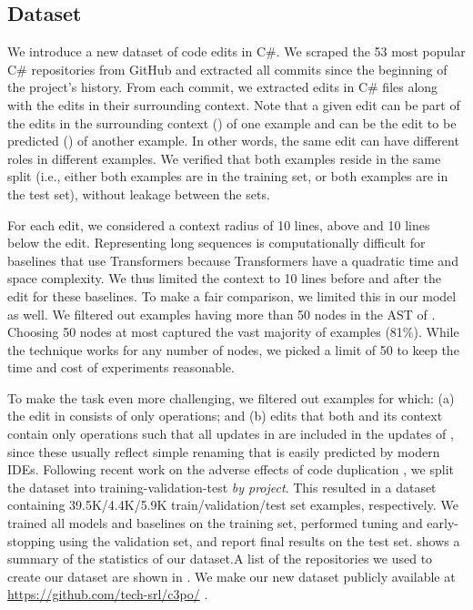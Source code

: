 \subsection{Dataset}
We introduce a new \ourtask{} dataset of code edits in C\#. We scraped the 53 most popular C\# repositories from GitHub
and extracted all commits since the beginning of the project's history. From each commit, we extracted edits in C\# files along with the edits in their surrounding context. 
Note that a given edit can be part of the edits in the surrounding context () of one example and can be the edit to be predicted  () of another example. In other words, the same edit can have different roles in different examples.
We verified that both examples reside in the same split (i.e., either both examples are in the training set, or both examples are in the test set), without leakage between the sets.

For each edit, we considered a context radius of 10 lines,  above and 10 lines below the edit. 
Representing long sequences is computationally difficult for baselines that use Transformers \cite{NIPS2017_7181} because Transformers have a quadratic time and space complexity. We thus limited the context to 10 lines before and after the edit for these baselines. To make a fair comparison, we limited this in our model as well.
We filtered out examples having more than 50 nodes in the AST of . 
Choosing 50 nodes at most captured the vast majority of examples (81\%). While the technique works for any number of nodes, we picked a limit of 50 to keep the time and cost of experiments reasonable.

To make the task even more challenging, we filtered out examples for which: (a) the edit in  consists of only \textbf{} operations; and (b) edits that both  and its context contain only \textbf{} operations such that all updates in  are included in the updates of ,
since these usually reflect simple renaming that is easily predicted by modern IDEs.
Following recent work on the adverse effects of code duplication \cite{lopes2017dejavu, allamanis2019adverse}, we split the dataset into training-validation-test \emph{by project}.
This resulted in a dataset containing 39.5K/4.4K/5.9K train/validation/test set examples, respectively. 
We trained all models and baselines on the training set, performed tuning and early-stopping using the validation set, and report final results on the test set.
 shows a summary of the statistics of our dataset.A list of the repositories we used to create our dataset are shown in . We make our new dataset publicly available at \url{https://github.com/tech-srl/c3po/} .

